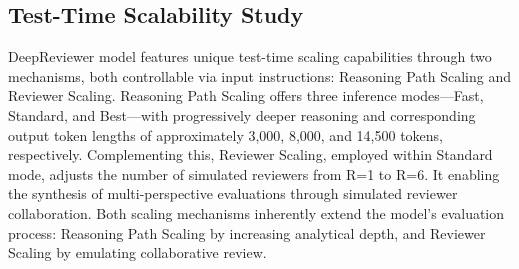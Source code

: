 \documentclass{article}
\begin{document}

\subsection{Test-Time Scalability Study}

DeepReviewer model features unique test-time scaling capabilities through two mechanisms, both controllable via input instructions: Reasoning Path Scaling and Reviewer Scaling. Reasoning Path Scaling offers three inference modes—Fast, Standard, and Best—with progressively deeper reasoning and corresponding output token lengths of approximately 3,000, 8,000, and 14,500 tokens, respectively. Complementing this, Reviewer Scaling, employed within Standard mode, adjusts the number of simulated reviewers from R=1 to R=6. It enabling the synthesis of multi-perspective evaluations through simulated reviewer collaboration. Both scaling mechanisms inherently extend the model's evaluation process: Reasoning Path Scaling by increasing analytical depth, and Reviewer Scaling by emulating collaborative review.
\end{document}
